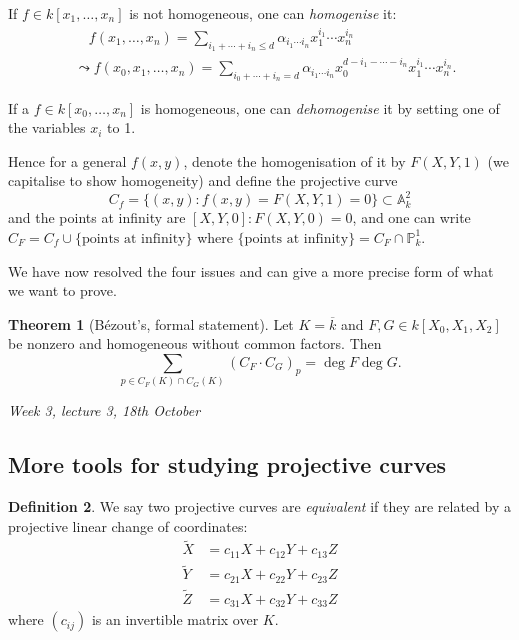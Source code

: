 \documentclass{article}
\newcommand{\p}{\mathbb{P}}
\newcommand{\A}{\mathbb{A}}
\theoremstyle{definition}
\newtheorem{defn}{Definition}[subsection]
\newtheorem{thm}[defn]{Theorem}
\begin{document}
If $f\in k[x_1,\ldots,x_n]$ is not homogeneous, one can \textit{homogenise} it:
\[
\begin{aligned}
&\quad f(x_1,\ldots,x_n)=\sum_{i_1+\cdots+i_n\leq d}\alpha_{i_1\cdots i_n}x_1^{i_1}\cdots x_n^{i_n}\\
&\leadsto f(x_0,x_1,\ldots,x_n)=\sum_{i_0+\cdots+i_n=d}\alpha_{i_1\cdots i_n}x_0^{d-i_1-\cdots-i_n}x_1^{i_1}\cdots x_n^{i_n}.
\end{aligned}
\]

If a $f\in k[x_0,\ldots,x_n]$ is homogeneous, one can \textit{dehomogenise} it by setting one of the variables $x_i$ to 1.

Hence for a general $f(x,y)$, denote the homogenisation of it by $F(X,Y,1)$ (we capitalise to show homogeneity) and define the projective curve
\[
C_f=\{(x,y):f(x,y)=F(X,Y,1)=0\}\subset\A_k^2
\]
and the points at infinity are $[X,Y,0]:F(X,Y,0)=0$, and one can write $C_F=C_f\cup\{\text{points at infinity}\}$ where $\{\text{points at infinity}\}=C_F\cap\p_k^1$.

We have now resolved the four issues and can give a more precise form of what we want to prove.

\begin{thm}[Bézout's, formal statement]
\label{thm:Bezout}
Let $K=\overline k$ and $F,G\in k[X_0,X_1,X_2]$ be nonzero and homogeneous without common factors. Then
\[
\sum_{p\in C_F(K)\cap C_G(K)} (C_F\cdot C_G)_p=\deg F \deg G.
\]
\end{thm}

\begin{flushright}
\textit{Week 3, lecture 3, 18th October}
\end{flushright}

\subsection{More tools for studying projective curves}

\begin{defn}
We say two projective curves are \textit{equivalent} if they are related by a projective linear change of coordinates:
\[
\begin{aligned}
\widetilde X&=c_{11}X+c_{12}Y+c_{13}Z \\
\widetilde Y&=c_{21}X+c_{22}Y+c_{23}Z \\
\widetilde Z&=c_{31}X+c_{32}Y+c_{33}Z
\end{aligned}
\]
where $(c_{ij})$ is an invertible matrix over $K$.
\end{defn}
\end{document}
